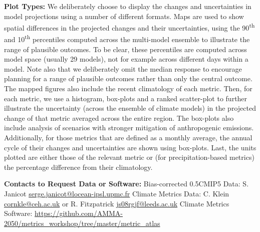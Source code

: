 \vspace{5mm}

\textbf{Plot Types:} We deliberately choose to display the changes and uncertainties in model projections using a number of different formats. Maps are used to show spatial differences in the projected changes and their uncertainties, using the 90\textsuperscript{th} and 10\textsuperscript{th} percentiles computed across the multi-model ensemble to illustrate the range of plausible outcomes. To be clear, these percentiles are computed across model space (usually 29 models), not for example across different days within a model. Note also that we deliberately omit the median response to encourage planning for a range of plausible outcomes rather than only the central outcome. The mapped figures also include the recent climatology of each metric. Then, for each metric, we use a histogram, box-plots and a ranked scatter-plot to further illustrate the uncertainty (across the ensemble of climate models) in the projected change of that metric averaged across the entire region. The box-plots also include analysis of scenarios with stronger mitigation of anthropogenic emissions. Additionally, for those metrics that are defined as a monthly average, the annual cycle of their changes and uncertainties are shown using box-plots. Last, the units plotted are either those of the relevant metric or (for precipitation-based metrics) the percentage difference from their climatology.

\vspace{5mm}

\textbf{Contacts to Request Data or Software:}
Bias-corrected 0.5\textdegree CMIP5 Data: S. Janicot \href{mailto:serge.janicot@locean-ipsl.upmc.fr}{serge.janicot@locean-ipsl.upmc.fr} \newline
Climate Metrics Data: C. Klein \href{mailto:cornkle@ceh.ac.uk}{cornkle@ceh.ac.uk} or R. Fitzpatrick \href{mailto:js08rgjf@leeds.ac.uk}{js08rgjf@leeds.ac.uk} \newline
Climate Metrics Software: \url{https://github.com/AMMA-2050/metrics_workshop/tree/master/metric_atlas} \newline
